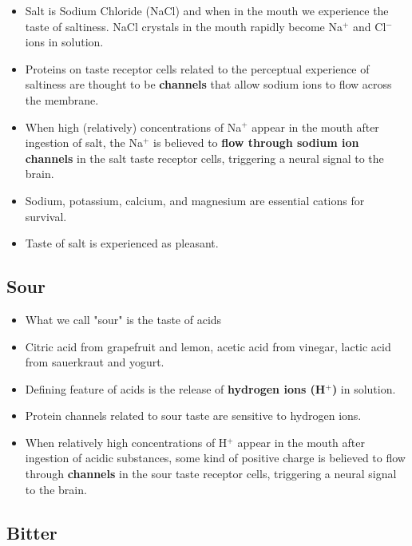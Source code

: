 \documentclass{article}
\begin{document}
\begin{itemize}
    \item Salt is Sodium Chloride (NaCl) and when in the mouth we experience the taste of saltiness. NaCl crystals in the mouth rapidly become Na$^+$ and Cl$^-$ ions in solution. 
    \item Proteins on taste receptor cells related to the perceptual experience of saltiness are thought to be \textbf{channels} that allow sodium ions to flow across the membrane. 
    \item When high (relatively) concentrations of Na$^+$ appear in the mouth after ingestion of salt, the Na$^+$ is believed to \textbf{flow through sodium ion channels} in the salt taste receptor cells, triggering a neural signal to the brain. 
    \item Sodium, potassium, calcium, and magnesium are essential cations for survival. 
    \item Taste of salt is experienced as pleasant. 
\end{itemize}

\subsection{Sour}

\begin{itemize}
    \item What we call "sour" is the taste of acids
    \item Citric acid from grapefruit and lemon, acetic acid from vinegar, lactic acid from sauerkraut and yogurt. 
    \item Defining feature of acids is the release of \textbf{hydrogen ions (H$^+$)} in solution. 
    \item Protein channels related to sour taste are sensitive to hydrogen ions. 
    \item When relatively high concentrations of H$^+$ appear in the mouth after ingestion of acidic substances, some kind of positive charge is believed to flow through \textbf{channels} in the sour taste receptor cells, triggering a neural signal to the brain. 
\end{itemize}

\subsection{Bitter}
\end{document}
